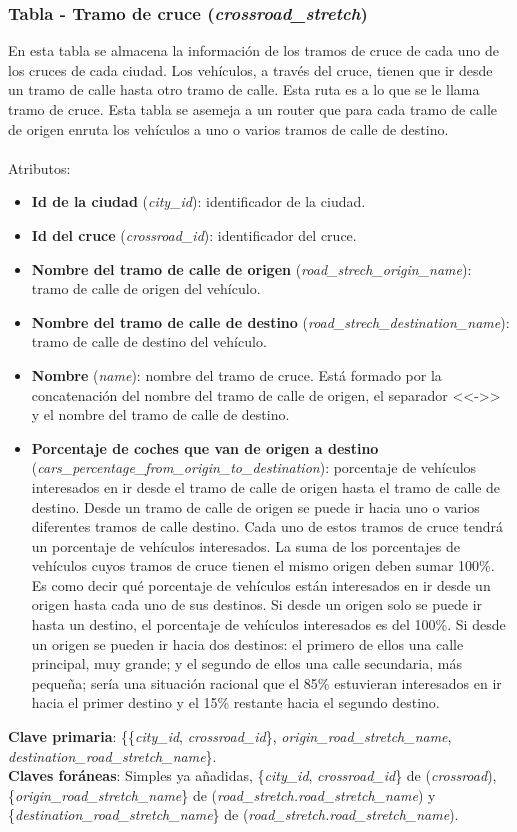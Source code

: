 \subsubsection{Tabla - Tramo de cruce (\textit{crossroad\_stretch})}
En esta tabla se almacena la información de los tramos de cruce de cada uno de los cruces de cada ciudad. Los vehículos, a través del cruce, tienen que ir desde un tramo de calle hasta otro tramo de calle. Esta ruta es a lo que se le llama tramo de cruce. Esta tabla se asemeja a un router que para cada tramo de calle de origen enruta los vehículos a uno o varios tramos de calle de destino. \\\\
Atributos:
\begin{itemize}
    \item \textbf{Id de la ciudad} (\textit{city\_id}): identificador de la ciudad.
    \item \textbf{Id del cruce} (\textit{crossroad\_id}): identificador del cruce.
    \item \textbf{Nombre del tramo de calle de origen} (\textit{road\_strech\_origin\_name}): tramo de calle de origen del vehículo.
    \item \textbf{Nombre del tramo de calle de destino} (\textit{road\_strech\_destination\_name}): tramo de calle de destino del vehículo.
    \item \textbf{Nombre} (\textit{name}): nombre del tramo de cruce. Está formado por la concatenación del nombre del tramo de calle de origen, el separador <<->> y el nombre del tramo de calle de destino.
    \item \textbf{Porcentaje de coches que van de origen a destino}\\ (\textit{cars\_percentage\_from\_origin\_to\_destination}): porcentaje de vehículos interesados en ir desde el tramo de calle de origen hasta el tramo de calle de destino. Desde un tramo de calle de origen se puede ir hacia uno o varios diferentes tramos de calle destino. Cada uno de estos tramos de cruce tendrá un porcentaje de vehículos interesados. La suma de los porcentajes de vehículos cuyos tramos de cruce tienen el mismo origen deben sumar 100\%. Es como decir qué porcentaje de vehículos están interesados en ir desde un origen hasta cada uno de sus destinos. Si desde un origen solo se puede ir hasta un destino, el porcentaje de vehículos interesados es del 100\%. Si desde un origen se pueden ir hacia dos destinos: el primero de ellos una calle principal, muy grande; y el segundo de ellos una calle secundaria, más pequeña; sería una situación racional que el 85\% estuvieran interesados en ir hacia el primer destino y el 15\% restante hacia el segundo destino. 
\end{itemize}
\textbf{Clave primaria}: \{\{\textit{city\_id}, \textit{crossroad\_id}\}, \textit{origin\_road\_stretch\_name}, \textit{destination\_road\_stretch\_name}\}. \\
\textbf{Claves foráneas}: Simples ya añadidas, \{\textit{city\_id}, \textit{crossroad\_id}\} de (\textit{crossroad}), \{\textit{origin\_road\_stretch\_name}\} de (\textit{road\_stretch.road\_stretch\_name}) \newline y \{\textit{destination\_road\_stretch\_name}\} de (\textit{road\_stretch.road\_stretch\_name}).

